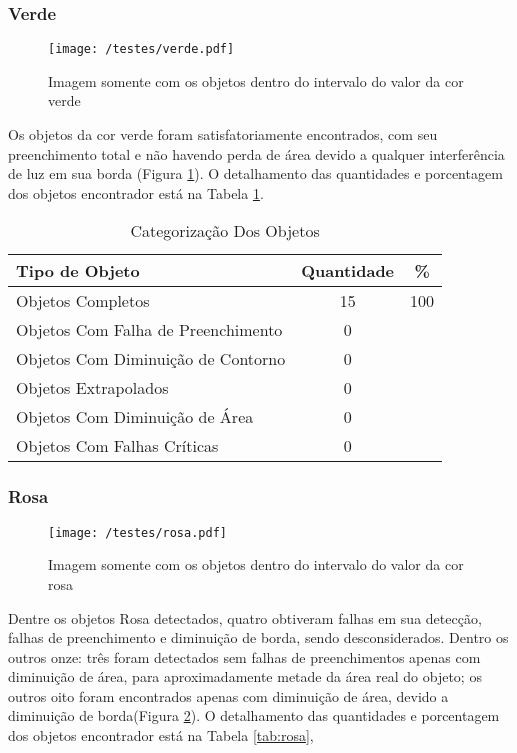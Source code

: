\subsubsection{Verde}
\begin{figure}[H]
		\centering
		\texttt{[image: /testes/verde.pdf]}
		\caption{Imagem somente com os objetos dentro do intervalo do valor da cor verde}
		\label{fig:verde}
	\end{figure}

Os objetos da cor verde foram satisfatoriamente encontrados, com seu preenchimento total e não havendo perda de área devido a qualquer interferência de luz em sua borda (Figura \ref{fig:verde}).	
	O detalhamento das quantidades e porcentagem dos objetos encontrador está na Tabela \ref{tab:verde}.
\begin{table}[h]
\centering
\begin{tabular}{l|c|c}
Tipo de Objeto & Quantidade & \% \\ %
\hline                               %
Objetos Completos &  15 &100 \\
\hline 
Objetos Com Falha de Preenchimento & 0\\
\hline 
Objetos Com Diminuição de Contorno &  0\\
\hline 
Objetos Extrapolados & 0 \\
\hline 
Objetos Com Diminuição de Área &  0 \\
\hline 
Objetos Com Falhas Críticas & 0 \\
\hline 
\end{tabular}
\caption{Categorização Dos Objetos}
\label{tab:verde}
\end{table}	
\subsubsection{Rosa}
	
	\begin{figure}[H]
		\centering
		\texttt{[image: /testes/rosa.pdf]}
		\caption{Imagem somente com os objetos dentro do intervalo do valor da cor rosa}
		\label{fig:rosa}
	\end{figure}
	
Dentre os objetos Rosa detectados, quatro obtiveram falhas em sua detecção, falhas de preenchimento e diminuição de borda, sendo desconsiderados. Dentro os outros onze: três foram detectados sem falhas de preenchimentos apenas com diminuição de área, para aproximadamente metade da área real do objeto; os outros oito foram encontrados apenas com diminuição de área, devido a diminuição de borda(Figura \ref{fig:rosa}).  O detalhamento das quantidades e porcentagem dos objetos encontrador está na Tabela \ref{tab:rosa},
	
